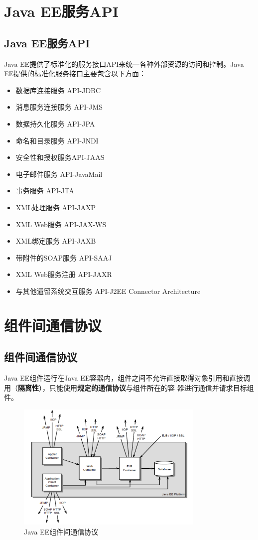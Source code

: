 \section{Java EE服务API}

\subsection{Java EE服务API} 

Java EE提供了标准化的服务接口API来统一各种外部资源的访问和控制。Java EE提供的标准化服务接口主要包含以下方面：

\begin{itemize}
\item 数据库连接服务 API-JDBC
\item 消息服务连接服务 API-JMS
\item 数据持久化服务 API-JPA
\item 命名和目录服务 API-JNDI
\item 安全性和授权服务API-JAAS
\item 电子邮件服务 API-JavaMail
\item 事务服务 API-JTA
\item XML处理服务 API-JAXP
\item XML Web服务 API-JAX-WS
\item XML绑定服务 API-JAXB
\item 带附件的SOAP服务 API-SAAJ
\item XML Web服务注册 API-JAXR
\item 与其他遗留系统交互服务 API-J2EE Connector Architecture
\end{itemize}

\section{组件间通信协议}

\subsection{组件间通信协议} 

Java EE组件运行在Java EE容器内，组件之间不允许直接取得对象引用和直接调
用（{\bf\Red 隔离性}），只能使用{\bf\Red 规定的通信协议}与组件所在的容
器进行通信并请求目标组件。

\begin{figure}[htb]
\centering
\includegraphics[width=0.8\textwidth]{images/JavaEE-architecture/fig-com-protocol.png}
\caption{Java EE组件间通信协议}
\label{fig:javaee-com-protocol}
\end{figure}

